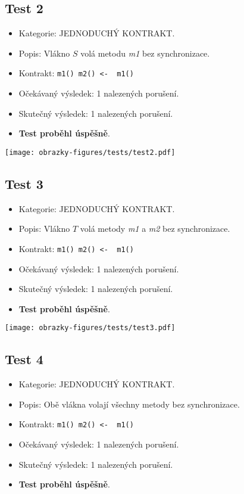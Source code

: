 \subsection*{Test 2}

\begin{itemize}
\item Kategorie: JEDNODUCHÝ KONTRAKT.
\item Popis: Vlákno $S$ volá metodu \textit{m1} bez synchronizace.
\item Kontrakt: \texttt{m1() m2() <- { m1() }}
\item Očekávaný výsledek: 1 nalezených porušení.
\item Skutečný výsledek: 1 nalezených porušení.
\item \textbf{Test proběhl úspěšně}.
\end{itemize}

\begin{center}
    \centering
    \texttt{[image: obrazky-figures/tests/test2.pdf]}
    \label{test2}
\end{center}

\subsection*{Test 3}
\begin{itemize}
\item Kategorie: JEDNODUCHÝ KONTRAKT.
\item Popis: Vlákno $T$ volá metody \textit{m1} a \textit{m2} bez synchronizace.
\item Kontrakt: \texttt{m1() m2() <- { m1() }}
\item Očekávaný výsledek: 1 nalezených porušení.
\item Skutečný výsledek: 1 nalezených porušení.
\item \textbf{Test proběhl úspěšně}.
\end{itemize}

\begin{center}
    \centering
    \texttt{[image: obrazky-figures/tests/test3.pdf]}
    \label{test3}
\end{center}

\subsection*{Test 4}
\begin{itemize}

\item Kategorie: JEDNODUCHÝ KONTRAKT.
\item Popis: Obě vlákna volají všechny metody bez synchronizace.
\item Kontrakt: \texttt{m1() m2() <- { m1() }}
\item Očekávaný výsledek: 1 nalezených porušení.
\item Skutečný výsledek: 1 nalezených porušení.
\item \textbf{Test proběhl úspěšně}.
\end{itemize}

